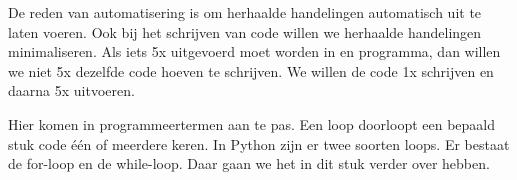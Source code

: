 De reden van automatisering is om herhaalde handelingen automatisch uit te laten voeren. Ook bij het schrijven van code willen we herhaalde handelingen minimaliseren. Als iets 5x uitgevoerd moet worden in en programma, dan willen we niet 5x dezelfde code hoeven te schrijven. We willen de code 1x schrijven en daarna 5x uitvoeren.

Hier komen in programmeertermen  aan te pas. Een loop doorloopt een bepaald stuk code \'e\'en of meerdere keren. In Python zijn er twee soorten loops. Er bestaat de for-loop en de while-loop. Daar gaan we het in dit stuk verder over hebben.

